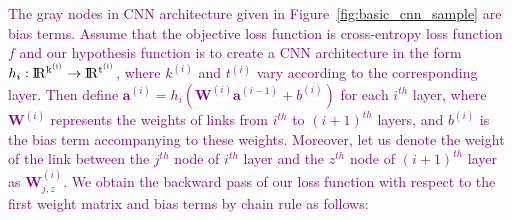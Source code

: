 \textcolor{purple}{The gray nodes in CNN architecture given in Figure~\ref{fig:basic_cnn_sample} are bias terms. Assume that the objective loss function is cross-entropy loss function $f$ and our hypothesis function is to create a CNN architecture in the form $h_{i}: \rm I\!R^{k^{(i)}} \rightarrow \rm I\!R^{t^{(i)}}$, where $k^{(i)}$ and $t^{(i)}$ vary according to the corresponding layer. Then define $\textbf{a}^{(i)} = h_{i}(\textbf{W}^{(i)} \textbf{a}^{(i-1)} + b^{(i)})$ for each $i^{th}$ layer, where $\textbf{W}^{(i)}$ represents the weights of links from $i^{th}$ to $(i+1)^{th}$ layers, and $b^{(i)}$ is the bias term accompanying to these weights. Moreover, let us denote the weight of the link between the $j^{th}$ node of $i^{th}$ layer and the $z^{th}$ node of $(i+1)^{th}$ layer as $\textbf{W}_{j,z}^{(i)}$. We obtain the backward pass of our loss function with respect to the first weight matrix and bias terms by chain rule as follows:}

